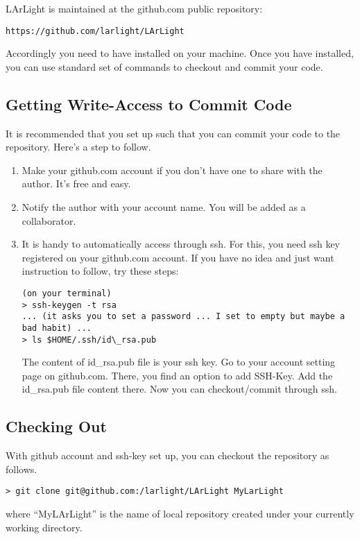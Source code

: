 LArLight is maintained at the github.com public \git repository:
\begin{lstlisting}
https://github.com/larlight/LArLight
\end{lstlisting}

Accordingly you need to have \git installed on your machine.
Once you have \git installed, you can use standard set of commands to checkout and commit your code.

\subsection{Getting Write-Access to Commit Code}

It is recommended that you set up such that you can commit your code to the repository.
Here's a step to follow.

\begin{enumerate}
\item Make your github.com account if you don't have one to share with the author. It's free and easy.
\item Notify the author with your account name. You will be added as a collaborator.
\item It is handy to automatically access through ssh. For this, you need ssh key registered on your github.com account. If you have no idea and just want instruction to follow, try these steps:
\begin{lstlisting}
(on your terminal)
> ssh-keygen -t rsa
... (it asks you to set a password ... I set to empty but maybe a bad habit) ...
> ls $HOME/.ssh/id\_rsa.pub
\end{lstlisting}
The content of id\_rsa.pub file is your ssh key. Go to your account setting page on github.com. There, you find an option to add SSH-Key. Add the id\_rsa.pub file content there. Now you can checkout/commit through ssh.
\end{enumerate}

\subsection{Checking Out}

With github account and ssh-key set up, you can checkout the repository as follows.
\begin{lstlisting}
> git clone git@github.com:/larlight/LArLight MyLarLight
\end{lstlisting}
where ``MyLArLight'' is the name of local repository created under your currently working directory.

